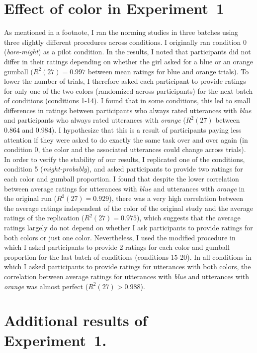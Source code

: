 
\chapter{Effect of color in Experiment~1}



As mentioned in a footnote, I ran the norming studies in three batches using three slightly different procedures across conditions. I originally ran condition 0 (\emph{bare-might}) as a pilot condition. In the results, I noted that participants did not differ in their ratings depending on whether the girl asked for a blue or an orange gumball ($R^2(27)=0.997$ between mean ratings for blue and orange trials). To lower the number of trials, I therefore asked each participant to provide ratings for only one of the two colors (randomized across participants) for the next batch of conditions (conditions 1-14). I found that in some conditions, this led to small differences in ratings between participants who always rated utterances with \emph{blue} and participants who always rated utterances with \textit{orange} ($R^2(27)$ between $0.864$ and $0.984$). I hypothesize that this is a result of participants paying less attention if they were asked to do exactly the same task over and over again (in condition 0, the color and the associated utterances could change across trials). In order to verify the stability of our results, I replicated one of the conditions, condition 5 (\emph{might-probably}), and asked participants to provide two ratings for each color and gumball proportion. I found that despite the lower correlation between average ratings for utterances with \emph{blue} and utterances with \emph{orange} in the original run ($R^2(27)=0.929$), there was a very high correlation between the average ratings independent of the color of the original study and the average ratings of the replication ($R^2(27)=0.975$), which suggests that the average ratings largely do not depend on whether I ask participants to provide ratings for both colors or just one color. Nevertheless, I used the modified procedure in which I asked participants to provide 2 ratings for each color and gumball proportion for the last batch of conditions (conditions 15-20). In all conditions in which I asked participants to provide ratings for utterances with both colors, the correlation between average ratings for utterances with \emph{blue} and utterances with \emph{orange} was almost perfect ($R^2(27)>0.988$).



\chapter{Additional results of Experiment~1.}


